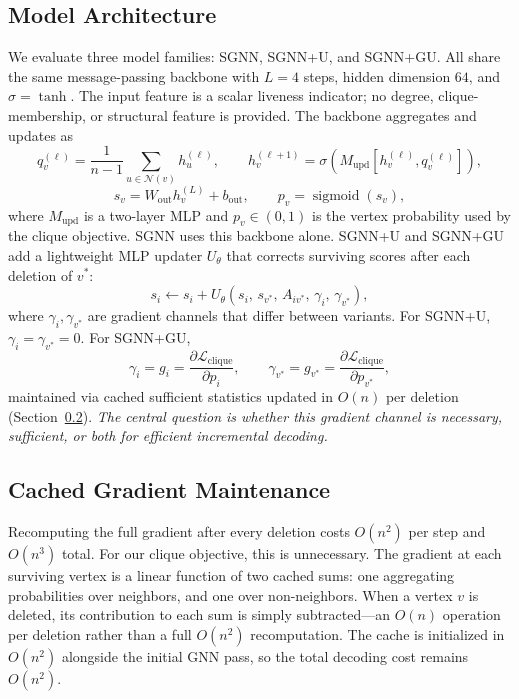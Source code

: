 \documentclass[11pt]{article}
\theoremstyle{plain}
\theoremstyle{remark}
\theoremstyle{plain}
\begin{document}
\subsection{Model Architecture}
\label{sec:architectures}

We evaluate three model families: SGNN, SGNN+U, and SGNN+GU. All share the same
message-passing backbone with $L=4$ steps, hidden dimension $64$, and $\sigma=\tanh$.
The input feature is a scalar liveness indicator; no degree, clique-membership, or
structural feature is provided. The backbone aggregates and updates as
\[
  q_v^{(\ell)} = \frac{1}{n-1}\sum_{u\in\mathcal{N}(v)} h_u^{(\ell)},
  \qquad
  h_v^{(\ell+1)} = \sigma\!\left(M_{\mathrm{upd}}\!\left[h_v^{(\ell)},
  q_v^{(\ell)}\right]\right),
\]
\[
  s_v = W_{\mathrm{out}} h_v^{(L)} + b_{\mathrm{out}},
  \qquad
  p_v = \operatorname{sigmoid}(s_v),
\]
where $M_{\mathrm{upd}}$ is a two-layer MLP and $p_v \in (0,1)$ is the vertex
probability used by the clique objective. SGNN uses this backbone alone. SGNN+U and
SGNN+GU add a lightweight MLP updater $U_\theta$ that corrects surviving scores after
each deletion of $v^*$:
\[
  s_i \leftarrow s_i + U_\theta(s_i,\, s_{v^*},\, A_{iv^*},\, \gamma_i,\,
  \gamma_{v^*}),
\]
where $\gamma_i, \gamma_{v^*}$ are gradient channels that differ between variants.
For SGNN+U, $\gamma_i = \gamma_{v^*} = 0$. For SGNN+GU,
\[
  \gamma_i = g_i = \frac{\partial \mathcal{L}_{\mathrm{clique}}}{\partial p_i},
  \qquad
  \gamma_{v^*} = g_{v^*} = \frac{\partial \mathcal{L}_{\mathrm{clique}}}{\partial
  p_{v^*}},
\]
maintained via cached sufficient statistics updated in $O(n)$ per deletion
(Section~\ref{sec:cached_maintenance}). \emph{The central question is whether this
gradient channel is necessary, sufficient, or both for efficient incremental decoding.}

\subsection{Cached Gradient Maintenance}
\label{sec:cached_maintenance}

Recomputing the full gradient after every deletion costs $O(n^2)$ per step and
$O(n^3)$ total. For our clique objective, this is unnecessary. The gradient at
each surviving vertex is a linear function of two cached sums: one aggregating
probabilities over neighbors, and one over non-neighbors. When a vertex $v$ is
deleted, its contribution to each sum is simply subtracted---an $O(n)$ operation
per deletion rather than a full $O(n^2)$ recomputation. The cache is initialized
in $O(n^2)$ alongside the initial GNN pass, so the total decoding cost remains
$O(n^2)$.
\end{document}
